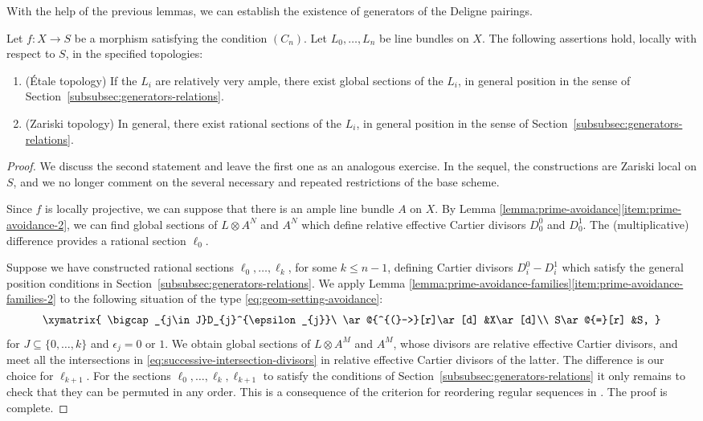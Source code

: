 With the help of the previous lemmas, we can establish the existence of generators of the Deligne pairings.
\begin{proposition}\label{prop:construction-generators}
Let $f\colon X\to S$ be a morphism satisfying the condition $(C_{n})$. Let $L_{0},\ldots, L_{n}$ be line bundles on $X$. The following assertions hold, locally with respect to $S$, in the specified topologies:
\begin{enumerate}
\item\label{item:construction-generators-1} (Étale topology) If the $L_{i}$ are relatively very ample, there exist global sections of the $L_{i}$, in general position in the sense of Section~\ref{subsubsec:generators-relations}.
\item\label{item:construction-generators-2} (Zariski topology) In general, there exist rational sections of the $L_{i}$, in general position in the sense of Section~\ref{subsubsec:generators-relations}.
\end{enumerate}
\end{proposition}
\begin{proof}
We discuss the second statement and leave the first one as an analogous exercise. In the sequel, the constructions are Zariski local on $S$, and we no longer comment on the several necessary and repeated restrictions of the base scheme.

Since $f$ is locally projective, we can suppose that there is an ample line bundle $A$ on $X$. By Lemma \ref{lemma:prime-avoidance}\eqref{item:prime-avoidance-2}, we can find global sections of $L\otimes A^{N}$ and $A^{N}$ which define relative effective Cartier divisors $D_{0}^{0}$ and $D_{0}^{1}$. The (multiplicative) difference provides a rational section $\ell_{0}$.

Suppose we have constructed rational sections $\ell_{0},\ldots, \ell_{k}$, for some $k\leq n-1$, defining Cartier divisors $D_{i}^{0}-D_{i}^{1}$ which satisfy the general position conditions in Section~\ref{subsubsec:generators-relations}. We apply Lemma \ref{lemma:prime-avoidance-families}\eqref{item:prime-avoidance-families-2} to the following situation of the type \eqref{eq:geom-setting-avoidance}:
\begin{equation}\label{eq:successive-intersection-divisors}
\xymatrix{
\bigcap_{j\in J}D_{j}^{\epsilon_{j}}\ \ar@{^{(}->}[r]\ar[d] &X\ar[d]\\
S\ar@{=}[r] &S,
}
\end{equation}
for $J\subseteq\lbrace 0,\ldots, k\rbrace$ and $\epsilon_{j}= 0$ or $1$. We obtain global sections of $L\otimes A^{M}$ and $A^{M}$, whose divisors are relative effective Cartier divisors, and meet all the intersections in \eqref{eq:successive-intersection-divisors} in relative effective Cartier divisors of the latter. The difference is our choice for $\ell_{k+1}$. For the sections $\ell_{0},\ldots,\ell_{k},\ell_{k+1}$ to satisfy the conditions of Section~\ref{subsubsec:generators-relations} it only remains to check that they can be permuted in any order. This is a consequence of the criterion for reordering regular sequences in \cite[\href{https://stacks.math.columbia.edu/tag/01ZM}{07DW}]{stacks-project}. The proof is complete.
\end{proof}

